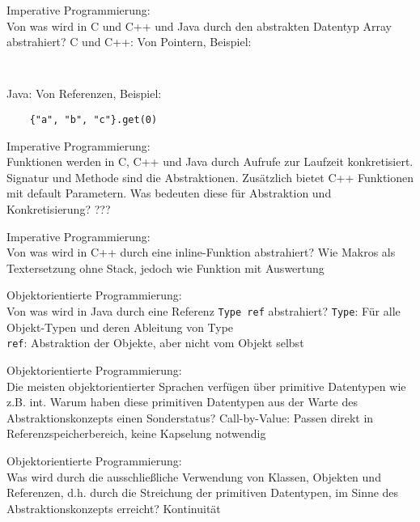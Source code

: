 \begin{card}
	Imperative Programmierung:\\
	Von was wird in C und C++ und Java durch den abstrakten Datentyp Array abstrahiert?
	\hr
	C und C++: Von Pointern, Beispiel: \begin{lstlisting}
		
		\end{lstlisting}
	
	Java: Von Referenzen, Beispiel: \begin{lstlisting}
	{"a", "b", "c"}.get(0)
	\end{lstlisting}
	
\end{card}

\begin{card}
	Imperative Programmierung:\\
	Funktionen werden in C, C++ und Java durch Aufrufe zur Laufzeit konkretisiert. Signatur und Methode sind die Abstraktionen. Zusätzlich bietet C++ Funktionen mit default Parametern. Was bedeuten diese für Abstraktion und Konkretisierung?
	\hr
	???
\end{card}

\begin{card}
	Imperative Programmierung:\\
	Von was wird in C++ durch eine inline-Funktion abstrahiert?
	\hr
	Wie Makros als Textersetzung ohne Stack, jedoch wie Funktion mit Auswertung
\end{card}

\begin{card}
	Objektorientierte Programmierung:\\
	Von was wird in Java durch eine Referenz \texttt{Type ref} abstrahiert?
	\hr
	\texttt{Type}: Für alle Objekt-Typen und deren Ableitung von Type\\
	\texttt{ref}: Abstraktion der Objekte, aber nicht vom Objekt selbst
\end{card}

\begin{card}
	Objektorientierte Programmierung:\\
	Die meisten objektorientierter Sprachen verfügen über primitive Datentypen wie z.B. int. Warum haben diese primitiven Datentypen aus der Warte des Abstraktionskonzepts einen Sonderstatus?
	\hr
	Call-by-Value: Passen direkt in Referenzspeicherbereich, keine Kapselung notwendig
\end{card}

\begin{card}
	Objektorientierte Programmierung:\\
	Was wird durch die ausschließliche Verwendung von Klassen, Objekten und Referenzen, d.h. durch die Streichung der primitiven Datentypen, im Sinne des Abstraktionskonzepts erreicht?
	\hr
	Kontinuität
\end{card}

